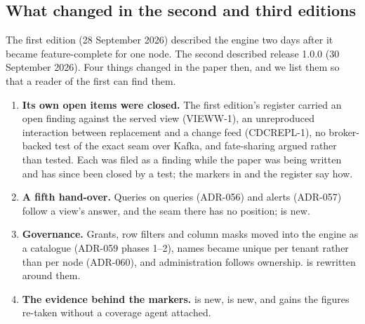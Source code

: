 \documentclass[11pt,a4paper]{article}
\renewcommand{\_}{\oldunderscore\allowbreak}
\begin{document}
\subsection{What changed in the second and third editions}

The first edition (28 September 2026) described the engine two days after it became feature-complete
for one node. The second described release 1.0.0 (30 September 2026). Four things changed in the
paper then, and we list them so that a reader of the first can find them.
\begin{enumerate}[leftmargin=*,itemsep=2pt]
\item \textbf{Its own open items were closed.} The first edition's register carried an open finding
      against the served view (VIEWW-1), an unreproduced interaction between replacement and a change
      feed (CDCREPL-1), no broker-backed test of the exact seam over Kafka, and fate-sharing argued rather
      than tested. Each was filed as a finding while the paper was being written and has since been closed
      by a test; the markers in  and the register say how.
\item \textbf{A fifth hand-over.} Queries on queries (ADR-056) and alerts (ADR-057) follow a view's
      answer, and the seam there has no position;  is new.
\item \textbf{Governance.} Grants, row filters and column masks moved into the engine as a catalogue
      (ADR-059 phases 1--2), names became unique per tenant rather than per node (ADR-060), and
      administration follows ownership.  is rewritten around them.
\item \textbf{The evidence behind the markers.}  is new,  is new,
      and  gains the figures re-taken without a coverage agent attached.
\end{enumerate}
\end{document}
